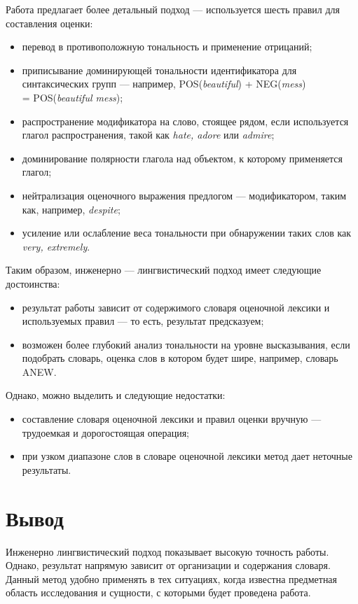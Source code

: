 Работа \cite{8pattrns} предлагает более детальный подход --- используется шесть правил для составления оценки:
\begin{itemize}
	\item перевод в противоположную тональность и применение отрицаний;
	\item приписывание доминирующей тональности идентификатора для синтаксических групп --- например, POS(\textit{beautiful}) + NEG(\textit{mess}) \\ = POS(\textit{beautiful mess});
	\item распространение модификатора на слово, стоящее рядом, если используется глагол распространения, такой как \textit{hate, adore} или \textit{admire};
	\item доминирование полярности глагола над объектом, к которому применяется глагол;
	\item нейтрализация оценочного выражения предлогом --- модификатором, таким как, например, \textit{despite};
	\item усиление или ослабление веса тональности при обнаружении таких слов как \textit{very, extremely}.
\end{itemize}

Таким образом, инженерно --- лингвистический подход имеет следующие достоинства:
\begin{itemize}
	\item результат работы зависит от содержимого словаря оценочной лексики и используемых правил --- то есть, результат предсказуем;
	\item возможен более глубокий анализ тональности на уровне высказывания, если подобрать словарь, оценка слов в котором будет шире, например, словарь ANEW.
\end{itemize}
Однако, можно выделить и следующие недостатки:
\begin{itemize}
	\item составление словаря оценочной лексики и правил оценки вручную --- трудоемкая и дорогостоящая операция;
	\item при узком диапазоне слов в словаре оценочной лексики метод дает неточные результаты. 
\end{itemize}
\section{Вывод}
Инженерно лингвистический подход показывает высокую точность работы. Однако, результат напрямую зависит от организации и содержания словаря. Данный метод удобно применять в тех ситуациях, когда известна предметная область исследования и сущности, с которыми будет проведена работа.